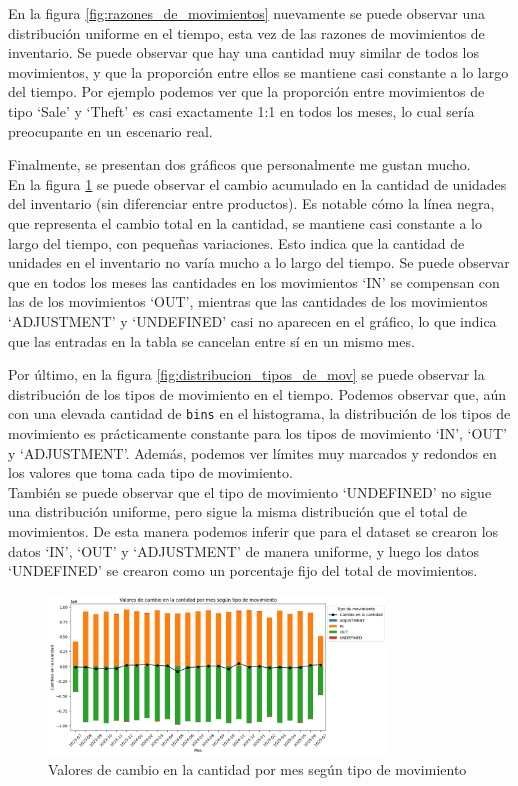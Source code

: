 En la figura \ref{fig:razones_de_movimientos} nuevamente se puede observar una distribución uniforme en el tiempo, esta vez de las razones de movimientos de inventario. Se puede observar que hay una cantidad muy similar de todos los movimientos, y que la proporción entre ellos se mantiene casi constante a lo largo del tiempo. Por ejemplo podemos ver que la proporción entre movimientos de tipo `Sale' y `Theft' es casi exactamente 1:1 en todos los meses, lo cual sería preocupante en un escenario real.

Finalmente, se presentan dos gráficos que personalmente me gustan mucho. \\
En la figura \ref{fig:cambios_cantidad_mes} se puede observar el cambio acumulado en la cantidad de unidades del inventario (sin diferenciar entre productos). Es notable cómo la línea negra, que representa el cambio total en la cantidad, se mantiene casi constante a lo largo del tiempo, con pequeñas variaciones. Esto indica que la cantidad de unidades en el inventario no varía mucho a lo largo del tiempo. Se puede observar que en todos los meses las cantidades en los movimientos `IN' se compensan con las de los movimientos `OUT', mientras que las cantidades de los movimientos `ADJUSTMENT' y `UNDEFINED' casi no aparecen en el gráfico, lo que indica que las entradas en la tabla se cancelan entre sí en un mismo mes.

Por último, en la figura \ref{fig:distribucion_tipos_de_mov} se puede observar la distribución de los tipos de movimiento en el tiempo. Podemos observar que, aún con una elevada cantidad de \texttt{bins} en el histograma, la distribución de los tipos de movimiento es prácticamente constante para los tipos de movimiento `IN', `OUT' y `ADJUSTMENT'. Además, podemos ver límites muy marcados y redondos en los valores que toma cada tipo de movimiento. \\
También se puede observar que el tipo de movimiento `UNDEFINED' no sigue una distribución uniforme, pero sigue la misma distribución que el total de movimientos. De esta manera podemos inferir que para el dataset se crearon los datos `IN', `OUT' y `ADJUSTMENT' de manera uniforme, y luego los datos `UNDEFINED' se crearon como un porcentaje fijo del total de movimientos.

\begin{figure}[H]
    \centering
    \includegraphics[width=0.8\textwidth]{imagenes/datos_uniformes/cambios_cantidad_mes.png}
    \caption{Valores de cambio en la cantidad por mes según tipo de movimiento}
    \label{fig:cambios_cantidad_mes}
\end{figure}

